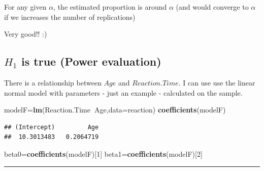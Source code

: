 \documentclass[]{article}
\newenvironment{Shaded}{\begin{snugshade}}{\end{snugshade}}
\newcommand{\CommentTok}[1]{\textcolor[rgb]{0.56,0.35,0.01}{\textit{#1}}}
\newcommand{\DataTypeTok}[1]{\textcolor[rgb]{0.13,0.29,0.53}{#1}}
\newcommand{\DecValTok}[1]{\textcolor[rgb]{0.00,0.00,0.81}{#1}}
\newcommand{\KeywordTok}[1]{\textcolor[rgb]{0.13,0.29,0.53}{\textbf{#1}}}
\newcommand{\NormalTok}[1]{#1}
\newcommand{\OperatorTok}[1]{\textcolor[rgb]{0.81,0.36,0.00}{\textbf{#1}}}
\begin{document}
For any given \(\alpha\), the estimated proportion is around \(\alpha\)
(and would converge to \(\alpha\) if we increases the number of
replications)

Very good!! :)

\hypertarget{h_1-is-true-power-evaluation}{%
\subsection{\texorpdfstring{\(H_1\) is true (Power
evaluation)}{H\_1 is true (Power evaluation)}}\label{h_1-is-true-power-evaluation}}

There is a relationship between \(Age\) and \(Reaction.Time\). I can use
use the linear normal model with parameters - just an example -
calculated on the sample.

\begin{Shaded}
\begin{Highlighting}[]
\NormalTok{modelF=}\KeywordTok{lm}\NormalTok{(Reaction.Time}\OperatorTok{~}\NormalTok{Age,}\DataTypeTok{data=}\NormalTok{reaction)}
\KeywordTok{coefficients}\NormalTok{(modelF)}
\end{Highlighting}
\end{Shaded}

\begin{verbatim}
## (Intercept)         Age 
##  10.3013483   0.2064719
\end{verbatim}

\begin{Shaded}
\begin{Highlighting}[]
\NormalTok{beta0=}\KeywordTok{coefficients}\NormalTok{(modelF)[}\DecValTok{1}\NormalTok{]}
\NormalTok{beta1=}\KeywordTok{coefficients}\NormalTok{(modelF)[}\DecValTok{2}\NormalTok{]}
\end{Highlighting}
\end{Shaded}

\begin{center}\rule{0.5\linewidth}{\linethickness}\end{center}

\begin{Shaded}
\end{Shaded}
\end{document}
